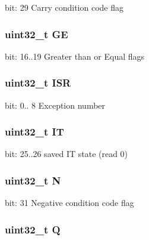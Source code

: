 bit\-: 29 Carry condition code flag \hypertarget{unionx_p_s_r___type_aa91800ec6e90e457c7a1acd1f2e17099}{
\subsubsection[{G\-E}]{\setlength{\rightskip}{0pt plus 5cm}uint32\-\_\-t G\-E}}\label{unionx_p_s_r___type_aa91800ec6e90e457c7a1acd1f2e17099}
bit\-: 16..19 Greater than or Equal flags \hypertarget{unionx_p_s_r___type_ad502ba7dbb2aab5f87c782b28f02622d}{
\subsubsection[{I\-S\-R}]{\setlength{\rightskip}{0pt plus 5cm}uint32\-\_\-t I\-S\-R}}\label{unionx_p_s_r___type_ad502ba7dbb2aab5f87c782b28f02622d}
bit\-: 0.. 8 Exception number \hypertarget{unionx_p_s_r___type_a76485660fe8ad98cdc71ddd7cb0ed777}{
\subsubsection[{I\-T}]{\setlength{\rightskip}{0pt plus 5cm}uint32\-\_\-t I\-T}}\label{unionx_p_s_r___type_a76485660fe8ad98cdc71ddd7cb0ed777}
bit\-: 25..26 saved I\-T state (read 0) \hypertarget{unionx_p_s_r___type_abae0610bc2a97bbf7f689e953e0b451f}{
\subsubsection[{N}]{\setlength{\rightskip}{0pt plus 5cm}uint32\-\_\-t N}}\label{unionx_p_s_r___type_abae0610bc2a97bbf7f689e953e0b451f}
bit\-: 31 Negative condition code flag \hypertarget{unionx_p_s_r___type_a65f27ddc4f7e09c14ce7c5211b2e000a}{
\subsubsection[{Q}]{\setlength{\rightskip}{0pt plus 5cm}uint32\-\_\-t Q}}\label{unionx_p_s_r___type_a65f27ddc4f7e09c14ce7c5211b2e000a}
